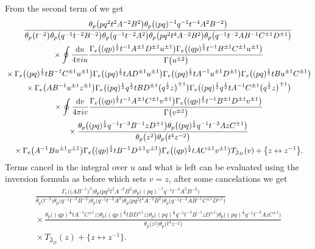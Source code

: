 \documentclass[a4paper,12pt]{article}
\begin{document}
From the second term of we get
\begin{gather*}
\frac{\theta_p\big(pq^2t^2A^{-2}B^2\big)\theta_p\big((pq)^{-1}q^{-1}t^{-4}A^2B^{-2}\big)}
{\theta_p\big(t^{-2}\big)\theta_p\big(q^{-1}t^{-2}B^{-2}\big)\theta_p\big(q^{-1}t^{-2}A^2\big)\theta_p\big(pq^2t^4A^{-2}B^2\big)
\theta_p\big(q^{-1}t^{-2}AB^{-1}C^{\pm1}D^{\pm1}\big)}\\
{}\times\oint\frac{{\rm d}u}{4\pi i u} \frac{\Gamma_e\big((q p)^{\frac12 }t^{-1} A^{\pm1} D^{\pm1}u^{\pm1}\big)
\Gamma_e\big((q p)^{\frac12 }t^{-1} B^{\pm1} C^{\pm1}u^{\pm1}\big)}{\Gamma\big(u^{\pm2}\big)}\\
{}\times\Gamma_e\big((pq)^\frac12 t B^{-1} C^{\pm1}u^{\pm1}\big) \Gamma_e\big((pq)^\frac12 t A D^{\pm1}u^{\pm1}\big)
\Gamma_e\big((pq)^\frac{1}{2}t A^{-1}u^{\pm1}D^{\pm1}\big)
\Gamma_e\big((pq)^\frac{1}{2}t B u^{\pm1}C^{\pm1}\big)\\
{}\times\Gamma_e\big(AB^{-1}u^{\pm1}z^{\pm1}\big)
\Gamma_e\big((pq)^\frac{1}{2}q^\frac{1}{2}t B D^{\pm1}\big(q^\frac{1}{2}z\big)^{\pm1}\big)
\Gamma_e\big((pq)^{\frac{1}{2}}q^\frac{1}{2}tA^{-1}C^{\pm1}\big(q^\frac{1}{2}z\big)^{\pm1}\big)\\
{}\times\oint\frac{{\rm d}v}{4\pi i v} \frac{\Gamma_e\big((q p)^{\frac12 }t^{-1} A^{\pm1} C^{\pm1}v^{\pm1}\big)
\Gamma_e\big((q p)^{\frac12 }t^{-1} B^{\pm1} D^{\pm1}v^{\pm1}\big)}{\Gamma\big(v^{\pm2}\big)}\\
{}\times\frac{\theta_p\big((pq)^\frac{1}{2}q^{-1}t^{-3}B^{-1}z D^{\pm1}\big)
\theta_p\big((pq)^\frac{1}{2}q^{-1}t^{-3}A z C^{\pm1}\big)}
{\theta_p\big(z^2\big)\theta_p\big(t^4z^{-2}\big)}\\
{}\times\Gamma_e\big( A^{-1}B u^{\pm1} v^{\pm1}\big)\Gamma_e\big((qp)^{\frac12}t B^{-1}D^{\pm1} v^{\pm1}\big)
\Gamma_e\big((q p)^{\frac12}t A C^{\pm1} v^{\pm1}\big)T_{{\mathfrak J}_D}(v) + \big\{z\leftrightarrow z^{-1}\big\} .
\end{gather*}
Terms cancel in the integral over $u$ and what is left can be evaluated using the inversion formula as before which sets $v=z$, after some cancelations we get
\begin{gather*}
\frac{\Gamma_e\big(\big(AB^{-1}\big)^2\big)	\theta_p\big(pq^2t^2A^{-2}B^2\big)
\theta_p\big((pq)^{-1}q^{-1}t^{-4}A^2B^{-2}\big)}
{\theta_p\big(t^{-2}\big)\theta_p\big(q^{-1}t^{-2}B^{-2}\big)\theta_p\big(q^{-1}t^{-2}A^2\big)\theta_p\big(pq^2t^4A^{-2}B^2\big)
\theta_p\big(q^{-1}t^{-2}AB^{-1}C^{\pm1}D^{\pm1}\big)}\\
{}\!\times\!\frac{\theta_p\big((q p)^{\frac12 }t A^{-1} C^{\pm1}z\big)
\theta_p\big((q p)^{\frac12 }t B D^{\pm1}z\big)
\theta_p\big((pq)^\frac{1}{2}q^{-1}t^{-3}B^{-1}z D^{\pm1}\big)
\theta_p\big((pq)^\frac{1}{2}q^{-1}t^{-3}A z C^{\pm1}\big)}{\theta_p\big(z^2\big)\theta_p\big(t^4z^{-2}\big)}\\
{}\!\times\! T_{{\mathfrak J}_D}(z)+ \big\{z\leftrightarrow z^{-1}\big\} .
\end{gather*}
\end{document}

